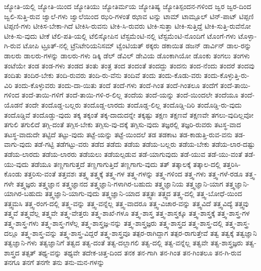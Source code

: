 {ಜ್ಯೋತಿ-ಯಲ್ಲಿ
ಜ್ಯೋತಿ-ಯಿಂದ
ಜ್ಯೋತಿಯು
ಜ್ಯೋತಿರ್ಮಯ
ಜ್ಯೋತಿಷ್ಯ
ಜ್ಯೋತಿಸ್ಪಂದನ-ಗಳಿಂದ
ಜ್ವರ
ಜ್ವರ-ದಿಂದ
ಜ್ವಲಿ-ಸುತ್ತಿ-ರುವ
ಜ್ವಾಲೆ-ಗಳು
ಜ್ವಾಲೆಯಿಂದ
ಝರಿ-ಗಳಂತೆ
ಝಾವ
ಟನ್ನು
ಟಾಮ್
ಟಾಮ್ಪೂಲ್
ಟಿನ್-ಪಾಟ್
ಟಿಪ್ಪಣಿ
ಟಿಪ್ಪಣಿ-ಗಳು
ಟೀಕಿಸ-ಬೇಕಾ-ಗಿದೆ
ಟೀಕಿಸಿ-ರುವನು
ಟೀಕಿ-ಸಿ-ರುವರು
ಟೀಕಿ-ಸುತ್ತಾ
ಟೀಕಿ-ಸುತ್ತಿದ್ದೆ
ಟೀಕಿ-ಸುತ್ತಿ-ರುವೆನೋ
ಟೀಕಿ-ಸು-ವುದು
ಟೀಕೆ
ಟೆಲಿ-ಪತಿ-ಯಲ್ಲಿ
ಟೆಲಿಸ್ಕೋಪಿನ
ಟೆಸ್ಟಮೆಂಟಿ-ನಲ್ಲಿ
ಟೆಸ್ಟಮೆಂಟಿ-ನೊಂದಿಗೆ
ಟೊಂಗೆ-ಗಳು
ಟೊಳ್ಳಾ-ಗಿ-ರುವ
ಟೋಪಿ
ಟ್ರೂತ್-ನಲ್ಲಿ
ಟ್ರೆನಿಟೇರಿಯನಿಸಮ್
ಟ್ವೆಂಟಿಯತ್
ಠಕ್ಕರು
ಡಕಾಯಿತ
ಡಜನ್
ಡಾರ್ವಿನ್
ಡಾಲ-ರನ್ನು
ಡಾಲರು
ಡಾಲರು-ಗಳನ್ನು
ಡಾಲರು-ಗಳು
ಡಿಕ್ಕಿ
ಡೆಲ್
ಡೆವಿಲ್
ಡೇವಿಯ
ಡೊಂಕಾಗಿಯೋ
ಡೊಂಕು
ತಂಗಲು
ತಂಗಳು
ತಂಟೆಯೇ
ತಂಡ
ತಂಡ-ಗಳು
ತಂಡದ
ತಂತು
ತಂತ್ರ
ತಂದ
ತಂದಂತೆ
ತಂದದ್ದು
ತಂದನು
ತಂದ-ನೆಂದು
ತಂದರೆ
ತಂದವು
ತಂದಿತು
ತಂದಿರ-ಬೇಕು
ತಂದಿ-ರುವರು
ತಂದಿ-ರು-ವೆನು
ತಂದಿವೆ
ತಂದು
ತಂದು-ಕೊಡು-ವರು
ತಂದು-ಕೊಳ್ಳುತ್ತಿ-ರು-ವಿರಿ
ತಂದು-ಕೊಳ್ಳುವರು
ತಂದು-ದಾ-ಯಿತು
ತಂದೆ
ತಂದೆ-ಗಳು
ತಂದೆ-ಗಿಂತ
ತಂದೆ-ಗಿಂತಲೂ
ತಂದೆಗೆ
ತಂದೆ-ತಾಯಿ-ಗಳಿಂದ
ತಂದೆ-ತಾಯಿ-ಗಳಿಗೆ
ತಂದೆ-ತಾಯಿ-ಗಳಿ-ರ-ಲಿಲ್ಲ
ತಂದೆಯ
ತಂದೆ-ಯನ್ನು
ತಂದೆ-ಯಿಂದಲೇ
ತಂದೆಯೂ
ತಂದೆ-ಯೊಡನೆ
ತಂದೇ
ತಂದೊಡ್ಡ-ಬಲ್ಲರು
ತಂದೊಡ್ಡ-ಲಾರದು
ತಂದೊಡ್ಡ-ಲಿಲ್ಲ
ತಂದೊಡ್ಡಿ-ದಿರಿ
ತಂದೊಡ್ಡಿ-ರು-ವುದು
ತಂದೊಡ್ಡಿವೆ
ತಂದೊಡ್ಡು-ವುದು
ತಕ್ಕ
ತಕ್ಕಂತೆ
ತಕ್ಕ-ದಾದುದನ್ನೇ
ತಕ್ಕಷ್ಟು
ತಕ್ಷಣ
ತಕ್ಷಣವೆ
ತಕ್ಷಣವೇ
ತಗಲು-ವುದಿಲ್ಲವೋ
ತಗುಲಿ
ತಗುಲಿದೆ
ತಗ್ಗಿ-ದಂತೆ
ತಗ್ಗಿಸ-ಬೇಕು
ತಗ್ಗಿಸು-ವು-ದಕ್ಕೆ
ತಗ್ಗಿಸು-ವುದು
ತಜ್ಞರಲ್ಲಿ
ತಜ್ಞರಿ-ರುವರು
ತಟಸ್ಥ-ವಾದ
ತಟಸ್ಥ-ವಾದುದೇ
ತಟ್ಟಿದೆ
ತಟ್ಟು-ವುದು
ತಟ್ಟೆ-ಯನ್ನು
ತಟ್ಟೆ-ಯಿಂದಲೆ
ತಡ
ತಡಕಾಟ
ತಡ-ಕಾಡುತ್ತಿ-ರುವ-ವನು
ತಡ-ವಾಗು-ವುದು
ತಡೆ-ಗಟ್ಟಿ
ತಡೆಗಟ್ಟು-ವರು
ತಡೆದ
ತಡೆದು
ತಡೆಯ
ತಡೆಯ-ಬಲ್ಲರು
ತಡೆಯ-ಬೇಕು
ತಡೆಯ-ಲಾರ-ದಷ್ಟು
ತಡೆಯ-ಲಾರದು
ತಡೆಯ-ಲಾರರು
ತಡೆಯಲು
ತಡೆಯಲ್ಪಡುವ
ತಡೆ-ಯಾಗುವುದು
ತಡೆ-ಯುವ
ತಡೆ-ಯು-ವಂತೆ
ತಡೆ-ಯು-ವುದು
ತಡೆಯೂ
ತಣ್ಣಗಾಗುತ್ತದೆ
ತಣ್ಣಗಾಗುತ್ತಿದೆ
ತಣ್ಣಗಾಗು-ವುದು
ತತ್
ತತ್ಕಾಲಕ್ಕೆ
ತತ್ಕಾಲ-ದಲ್ಲಿ
ತತ್ತರಿಸಿ-ಕೊಂಡು
ತತ್ತರಿಸು-ವಂತೆ
ತತ್ತವಶಃ
ತತ್ತ್ವ
ತತ್ತ್ವಕ್ಕೆ
ತತ್ತ್ವ-ಗಳ
ತತ್ತ್ವ-ಗಳನ್ನು
ತತ್ತ್ವ-ಗಳಿಂದ
ತತ್ತ್ವ-ಗಳು
ತತ್ತ್ವ-ಗಳೆ-ರಡೂ
ತತ್ತ್ವ-ಗಳೇ
ತತ್ತ್ವಜ್ಞರು
ತತ್ತ್ವಜ್ಞಾನ
ತತ್ತ್ವಜ್ಞಾನದ
ತತ್ತ್ವಜ್ಞಾನಿ-ಗಳಾಗಿರ-ಬಹುದು
ತತ್ತ್ವಜ್ಞಾನಿಯ
ತತ್ತ್ವಜ್ಞಾನಿ-ಯಾಗ
ತತ್ತ್ವಜ್ಞಾನಿ-ಯಾಗಿರ-ಬಹುದು
ತತ್ತ್ವಜ್ಞಾನಿ-ಯಾಗು-ವುದು
ತತ್ತ್ವಜ್ಞಾನಿ-ಯಾದ
ತತ್ತ್ವತಃ
ತತ್ತ್ವದ
ತತ್ತ್ವ-ದಲ್ಲಿ
ತತ್ತ್ವ-ಬೋಧೆ-ಯಿಂದ
ತತ್ತ್ವಮಸಿ
ತತ್ತ್ವ-ರಂಗ-ದಲ್ಲಿ
ತತ್ತ್ವ-ವನ್ನು
ತತ್ತ್ವ-ವನ್ನೆಲ್ಲ
ತತ್ತ್ವ-ವಾದರೂ
ತತ್ತ್ವ-ವಿಚಾರ-ವನ್ನು
ತತ್ತ್ವವಿದೆ
ತತ್ತ್ವವಿದ್ಯೆ
ತತ್ತ್ವವು
ತತ್ತ್ವವೆ
ತತ್ತ್ವವೆಲ್ಲ
ತತ್ತ್ವವೇ
ತತ್ತ್ವ-ವೇತ್ತರು
ತತ್ತ್ವ-ಶಾಖೆ-ಗಳೂ
ತತ್ತ್ವ-ಶಾಸ್ತ್ರ
ತತ್ತ್ವ-ಶಾಸ್ತ್ರಕ್ಕೂ
ತತ್ತ್ವ-ಶಾಸ್ತ್ರಕ್ಕೆ
ತತ್ತ್ವ-ಶಾಸ್ತ್ರ-ಗಳ
ತತ್ತ್ವ-ಶಾಸ್ತ್ರ-ಗಳು
ತತ್ತ್ವ-ಶಾಸ್ತ್ರ-ಗಳೆಲ್ಲ
ತತ್ತ್ವ-ಶಾಸ್ತ್ರಜ್ಞ-ನನ್ನು
ತತ್ತ್ವ-ಶಾಸ್ತ್ರಜ್ಞರು
ತತ್ತ್ವ-ಶಾಸ್ತ್ರದ
ತತ್ತ್ವ-ಶಾಸ್ತ್ರ-ದಲ್ಲಿ
ತತ್ತ್ವ-ಶಾಸ್ತ್ರ-ದಲ್ಲೂ
ತತ್ತ್ವ-ಶಾಸ್ತ್ರ-ವನ್ನು
ತತ್ತ್ವ-ಶಾಸ್ತ್ರ-ವಿದ್ದರೆ
ತತ್ತ್ವ-ಶಾಸ್ತ್ರವೂ
ತತ್ಪರ-ರಾಗಿದ್ದಾಗ
ತತ್ಪರ-ರಾಗುತ್ತೇವೆ
ತತ್ವ
ತತ್ವಕ್ಕೆ
ತತ್ವಜ್ಞಾನಿ
ತತ್ವಜ್ಞಾನಿ-ಗಳು
ತತ್ವಜ್ಞಾನಿಗೆ
ತತ್ವದ
ತತ್ವ-ದಂತೆ
ತತ್ವ-ದಲ್ಲಾಗಲಿ
ತತ್ವ-ದಲ್ಲಿ
ತತ್ವ-ವನ್ನೆಲ್ಲ
ತತ್ವವೇ
ತತ್ವ-ಶಾಸ್ತ್ರಜ್ಞರು
ತತ್ವ-ಶಾಸ್ತ್ರದ
ತತ್ಸತ್
ತಥ್ಯ-ವನ್ನು
ತಥ್ಯವೇ
ತದೇಕ-ಚಿತ್ತ-ದಿಂದ
ತನಕ
ತನ-ಗಾಗಿ
ತನ-ಗಿಂತ
ತನ-ಗಿಂತಲೂ
ತನ-ಗಿ-ರುವ
ತನಗೂ
ತನಗೆ
ತನಗೇ
ತನು
ತನು-ಮನ-ಗಳನ್ನು
}
